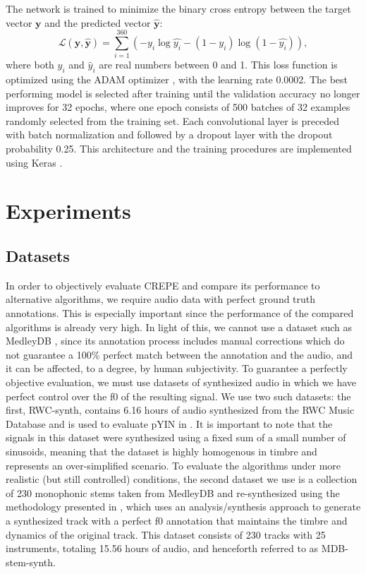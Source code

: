 The network is trained to minimize the binary cross entropy between the target vector $\mathbf{y}$ and the predicted vector $\mathbf{\hat{y}}$:
\begin{equation}
\mathcal{L}(\mathbf{y}, \mathbf{\hat{y}}) = \sum_{i=1}^{360} \left ( - y_i \log \hat{y_i} - (1 - y_i) \log (1 - \hat{y_i}) \right ),
\end{equation}
where both $y_i$ and $\hat{y}_i$ are real numbers between 0 and 1.
This loss function is optimized using the ADAM optimizer \cite{kingma2015adam}, with the learning rate 0.0002. 
The best performing model is selected after training until the validation accuracy no longer improves for 32 epochs, where one epoch consists of 500 batches of 32 examples randomly selected from the training set. 
Each convolutional layer is preceded with batch normalization \cite{ioffe2015batchnorm} and followed by a dropout layer \cite{srivastava2014dropout} with the dropout probability 0.25.
This architecture and the training procedures are implemented using Keras \cite{chollet2015keras}.




\section{Experiments}

\subsection{Datasets}

In order to objectively evaluate CREPE and compare its performance to alternative algorithms, we require audio data with perfect ground truth annotations.
This is especially important since the performance of the compared algorithms is already very high.
In light of this, we cannot use a dataset such as MedleyDB \cite{bittner2014medleydb}, since its annotation process includes manual corrections which do not guarantee a 100\% perfect match between the annotation and the audio, and it can be affected, to a degree, by human subjectivity.
To guarantee a perfectly objective evaluation, we must use datasets of synthesized audio in which we have perfect control over the f0 of the resulting signal.
We use two such datasets: the first, RWC-synth, contains 6.16 hours of audio synthesized from the RWC Music Database \cite{goto2002rwc} and is used to evaluate pYIN in \cite{mauch2014pyin}.
It is important to note that the signals in this dataset were synthesized using a fixed sum of a small number of sinusoids, meaning that the dataset is highly homogenous in timbre and represents an over-simplified scenario.
To evaluate the algorithms under more realistic (but still controlled) conditions, the second dataset we use is a collection of 230 monophonic stems taken from MedleyDB and re-synthesized using the methodology presented in \cite{salamon2017analysis}, which uses an analysis/synthesis approach to generate a synthesized track with a perfect f0 annotation that maintains the timbre and dynamics of the original track.
This dataset consists of 230 tracks with 25 instruments, totaling 15.56 hours of audio, and henceforth referred to as MDB-stem-synth.


